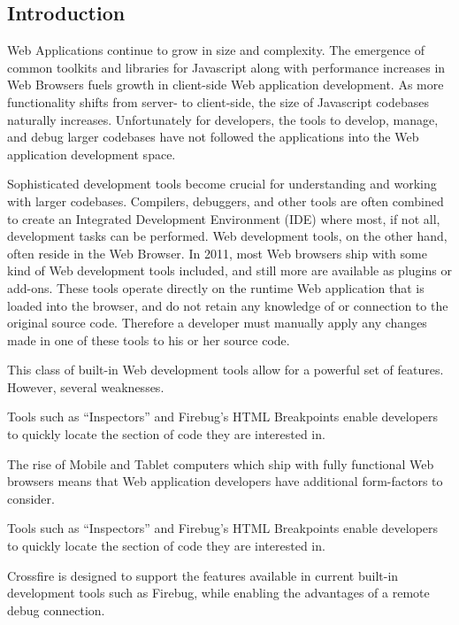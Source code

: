 \begin{introduction}
\section{Introduction}
Web Applications continue to grow in size and complexity. The
emergence of common toolkits and libraries for Javascript along with performance
increases in Web Browsers fuels growth in client-side Web application
development. As more functionality shifts from server- to client-side, the size
of Javascript codebases naturally increases. Unfortunately for developers, the
tools to develop, manage, and debug larger codebases have not followed the
applications into the Web application development space.

Sophisticated development tools become crucial for understanding
and working with larger codebases. Compilers, debuggers, and other tools are
often combined to create an Integrated Development Environment (IDE) where
most, if not all, development tasks can be performed. Web development tools, on
the other hand, often reside in the Web Browser. In 2011, most Web
browsers ship with some kind of Web development tools included\cite{something},
and still more are available as plugins or add-ons. These tools operate
directly on the runtime Web application that is loaded into the browser, and do
not retain any knowledge of or connection to the original source code. Therefore
a developer must manually apply any changes made in one of these tools to his or
her source code.

This class of built-in Web development tools allow for a powerful set of
features.  However, several weaknesses.

Tools such as ``Inspectors'' and Firebug's HTML Breakpoints\cite{jjb-www2010}
enable developers to quickly locate the section of code they are interested in.

The rise of Mobile and Tablet computers which ship with fully functional Web
browsers means that Web application developers have additional form-factors to
consider.

Tools such as ``Inspectors'' and Firebug's HTML Breakpoints\cite{jjb-www2010}
enable developers to quickly locate the section of code they are interested in.

Crossfire is designed to support the features available in current built-in
development tools such as Firebug, while enabling the advantages of a remote
debug connection.

\end{introduction}